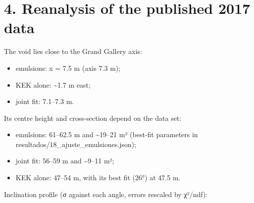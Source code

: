 \documentclass[
]{article}
\providecommand{\tightlist}{%
  \setlength{\itemsep}{0pt}\setlength{\parskip}{0pt}}
\begin{document}
\hypertarget{reanalysis-of-the-published-2017-data}{%
\section{4. Reanalysis of the published 2017
data}\label{reanalysis-of-the-published-2017-data}}

The void lies close to the Grand Gallery axis:

\begin{itemize}
\tightlist
\item
  emulsions: x = 7.5 m (axis 7.3 m);
\item
  KEK alone: \textasciitilde1.7 m east;
\item
  joint fit: 7.1--7.3 m.
\end{itemize}

Its centre height and cross-section depend on the data set:

\begin{itemize}
\tightlist
\item
  emulsions: 61--62.5 m and \textasciitilde19--21 m² (best-fit
  parameters in resultados/18\_ajuste\_emulsiones.json);
\item
  joint fit: 56--59 m and \textasciitilde9--11 m²;
\item
  KEK alone: 47--54 m, with its best fit (26°) at 47.5 m.
\end{itemize}

Inclination profile (σ against each angle, errors rescaled by χ²/ndf):
\end{document}
